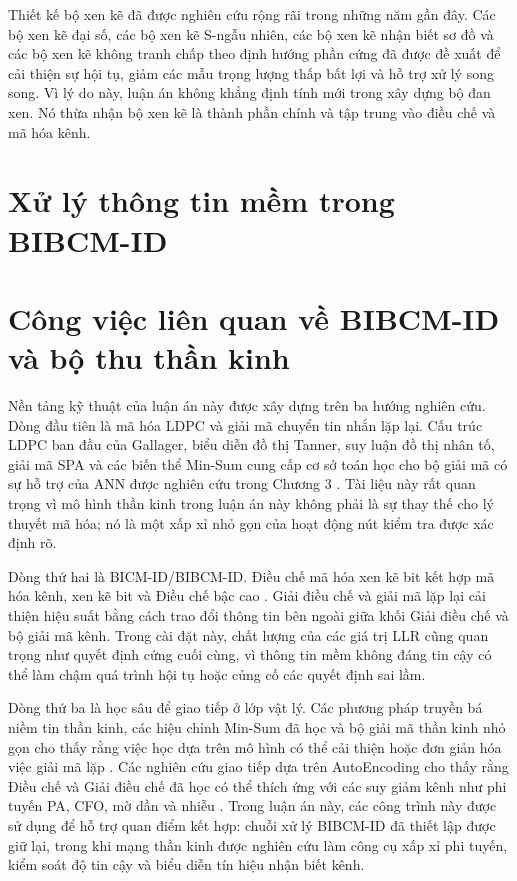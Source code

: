 Thiết kế bộ xen kẽ đã được nghiên cứu rộng rãi trong những năm gần đây. Các bộ xen kẽ đại số, các bộ xen kẽ S-ngẫu nhiên, các bộ xen kẽ nhận biết sơ đồ và các bộ xen kẽ không tranh chấp theo định hướng phần cứng đã được đề xuất để cải thiện sự hội tụ, giảm các mẫu trọng lượng thấp bất lợi và hỗ trợ xử lý song song. Vì lý do này, luận án không khẳng định tính mới trong xây dựng bộ đan xen. Nó thừa nhận bộ xen kẽ là thành phần chính và tập trung vào điều chế và mã hóa kênh.

\section{Xử lý thông tin mềm trong BIBCM-ID}




\section{Công việc liên quan về BIBCM-ID và bộ thu thần kinh}
Nền tảng kỹ thuật của luận án này được xây dựng trên ba hướng nghiên cứu. Dòng đầu tiên là mã hóa LDPC và giải mã chuyển tin nhắn lặp lại. Cấu trúc LDPC ban đầu của Gallager, biểu diễn đồ thị Tanner, suy luận đồ thị nhân tố, giải mã SPA và các biến thể Min-Sum cung cấp cơ sở toán học cho bộ giải mã có sự hỗ trợ của ANN được nghiên cứu trong Chương 3 \cite{gallager1962,tanner1981,kschischang2001,hu2001spa,chen2002}. Tài liệu này rất quan trọng vì mô hình thần kinh trong luận án này không phải là sự thay thế cho lý thuyết mã hóa; nó là một xấp xỉ nhỏ gọn của hoạt động nút kiểm tra được xác định rõ.

Dòng thứ hai là BICM-ID/BIBCM-ID. Điều chế mã hóa xen kẽ bit kết hợp mã hóa kênh, xen kẽ bit và Điều chế bậc cao \cite{zehavi1992,caire1998,li1997,li1998}. Giải điều chế và giải mã lặp lại cải thiện hiệu suất bằng cách trao đổi thông tin bên ngoài giữa khối Giải điều chế và bộ giải mã kênh. Trong cài đặt này, chất lượng của các giá trị LLR cũng quan trọng như quyết định cứng cuối cùng, vì thông tin mềm không đáng tin cậy có thể làm chậm quá trình hội tụ hoặc củng cố các quyết định sai lầm.

Dòng thứ ba là học sâu để giao tiếp ở lớp vật lý. Các phương pháp truyền bá niềm tin thần kinh, các hiệu chỉnh Min-Sum đã học và bộ giải mã thần kinh nhỏ gọn cho thấy rằng việc học dựa trên mô hình có thể cải thiện hoặc đơn giản hóa việc giải mã lặp \cite{nachmani2016,nachmani2018,lugosch2017,kuck2020,wang2022}. Các nghiên cứu giao tiếp dựa trên AutoEncoding cho thấy rằng Điều chế và Giải điều chế đã học có thể thích ứng với các suy giảm kênh như phi tuyến PA, CFO, mờ dần và nhiễu \cite{oshea2017,dorner2018,aoudia2019,rapp1991,saleh1981}. Trong luận án này, các công trình này được sử dụng để hỗ trợ quan điểm kết hợp: chuỗi xử lý BIBCM-ID đã thiết lập được giữ lại, trong khi mạng thần kinh được nghiên cứu làm công cụ xấp xỉ phi tuyến, kiểm soát độ tin cậy và biểu diễn tín hiệu nhận biết kênh.

